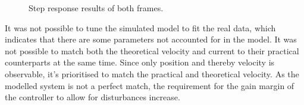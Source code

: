 \documentclass[../../main]{subfiles}
\begin{document}
\begin{figure}[H]
        \centering
				\def\svgwidth{0.47\columnwidth}
				\def\svgwidth{0.47\columnwidth}
				\caption{Step response results of both frames.}
				\label{fig:validation_steptuning}
\end{figure}
It was not possible to tune the simulated model to fit the real data,
which indicates that there are some parameters not accounted for in the model.
It was not possible to match both the theoretical velocity and current to their practical counterparts at the same time. Since only position and thereby velocity is observable, it's prioritised to match the practical and theoretical velocity.
As the modelled system is not a perfect match, the requirement for the gain margin of the controller to allow for disturbances increase.
\end{document}
